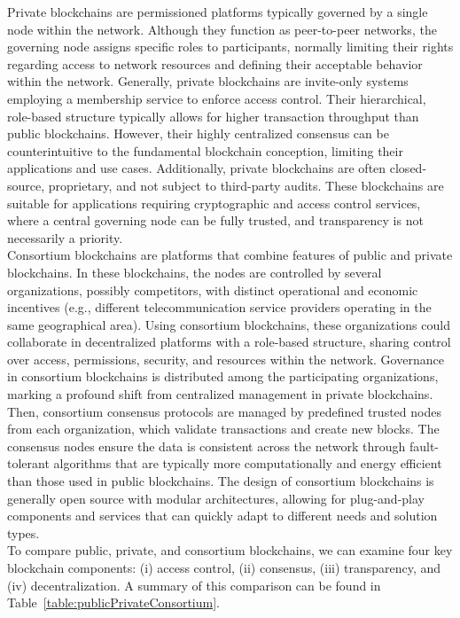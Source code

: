 \documentclass[conference]{IEEEtran}
\begin{document}
Private blockchains are permissioned platforms typically governed by a single node within the network. Although they function as peer-to-peer networks, the governing node assigns specific roles to participants, normally limiting their rights regarding access to network resources and defining their acceptable behavior within the network. Generally, private blockchains are invite-only systems employing a membership service to enforce access control. Their hierarchical, role-based structure typically allows for higher transaction throughput than public blockchains. However, their highly centralized consensus can be counterintuitive to the fundamental blockchain conception, limiting their applications and use cases. Additionally, private blockchains are often closed-source, proprietary, and not subject to third-party audits. These blockchains are suitable for applications requiring cryptographic and access control services, where a central governing node can be fully trusted, and transparency is not necessarily a priority. \\

Consortium blockchains are platforms that combine features of public and private blockchains. In these blockchains, the nodes are controlled by several organizations, possibly competitors, with distinct operational and economic incentives (e.g., different telecommunication service providers operating in the same geographical area). Using consortium blockchains, these organizations could collaborate in decentralized platforms with a role-based structure, sharing control over access, permissions, security, and resources within the network. Governance in consortium blockchains is distributed among the participating organizations, marking a profound shift from centralized management in private blockchains. Then, consortium consensus protocols are managed by predefined trusted nodes from each organization, which validate transactions and create new blocks. The consensus nodes ensure the data is consistent across the network through fault-tolerant algorithms that are typically more computationally and energy efficient than those used in public blockchains. The design of consortium blockchains is generally open source with modular architectures, allowing for plug-and-play components and services that can quickly adapt to different needs and solution types.\\

To compare public, private, and consortium blockchains, we can examine four key blockchain components: (i) access control, (ii) consensus, (iii) transparency, and (iv) decentralization. A summary of this comparison can be found in Table~\ref{table:publicPrivateConsortium}.\\
\end{document}
